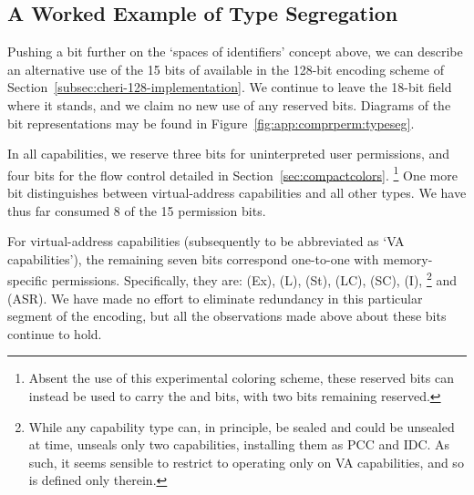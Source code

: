 \subsection{A Worked Example of Type Segregation} %

Pushing a bit further on the `spaces of identifiers' concept above, we can
describe an alternative use of the 15 bits of {\cmuperms} available in the
128-bit encoding scheme of Section~\ref{subsec:cheri-128-implementation}.  We
continue to leave the 18-bit \cotype{} field where it stands, and we claim no
new use of any reserved bits.  Diagrams of the bit representations may be found
in Figure~\ref{fig:app:comprperm:typeseg}.

In all capabilities, we reserve three bits for uninterpreted user
permissions, and four bits for the flow control detailed in
Section~\ref{sec:compactcolors}.%
%
\footnote{Absent the use of this experimental coloring scheme, these
reserved bits can instead be used to carry the \cappermG* and \cappermSLC*
bits, with two bits remaining reserved.}
%
One more bit distinguishes between virtual-address capabilities and all
other types.  We have thus far consumed 8 of the 15 permission bits.

For virtual-address capabilities
(subsequently to be abbreviated as `VA capabilities'),
the remaining seven bits correspond
one-to-one with memory-specific permissions.  Specifically, they are:
\cappermX* (Ex), \cappermL* (L), \cappermS* (St),
\cappermLC* (LC), \cappermSC* (SC), \cappermInvoke* (I),%
%
\footnote{While any capability type can, in principle, be sealed and could be
unsealed at  time,  unseals only two
capabilities, installing them as PCC and IDC.  As such, it seems sensible to
restrict  to operating only on VA capabilities, and so \cappermInvoke is
defined only therein.}
%
and \cappermASR* (ASR).  We have made no effort to
eliminate redundancy in this particular segment of the encoding, but all the
observations made above about these bits continue to hold.

